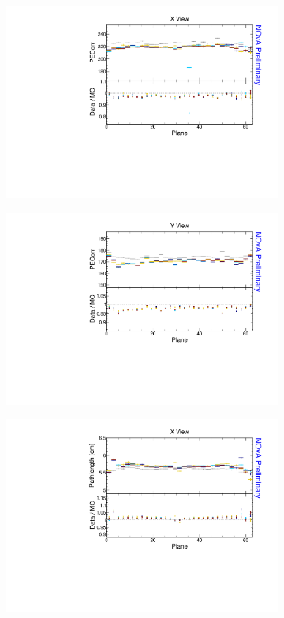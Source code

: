 \begin{figure}[!ht]
\begin{subfigure}{0.495\textwidth}
  \end{subfigure}
  \begin{subfigure}{0.495\textwidth}
    \includegraphics[width=\linewidth]{essentialsec_tb/pecorr_plane_x.pdf}
  \end{subfigure}
  \begin{subfigure}{0.495\textwidth}
    \includegraphics[width=\linewidth]{essentialsec_tb/pecorr_plane_y.pdf}
  \end{subfigure}
  \begin{subfigure}{0.495\textwidth}
    \includegraphics[width=\linewidth]{essentialsec_tb/cm_plane_x.pdf}

\end{subfigure}
\end{figure}
